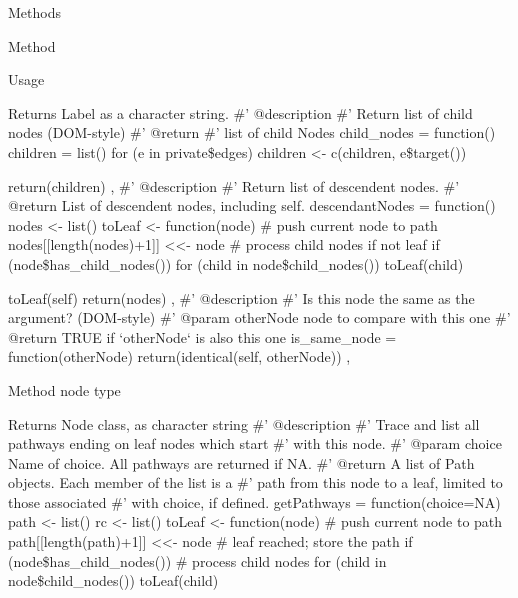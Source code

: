 \documentclass[a4paper]{book}
\begin{document}
\begin{Section}{Methods}
\begin{SubSection}{Method }
\begin{SubSubSection}{Usage}
\end{SubSubSection}


%
\begin{SubSubSection}{Returns}
Label as a character string.
\#' @description
\#' Return list of child nodes (DOM-style)
\#' @return 
\#' list of child Nodes
child\_nodes = function() 
children = list()
for (e in private\$edges) 
children <- c(children, e\$target())

return(children)
,
\#' @description 
\#' Return list of descendent nodes.
\#' @return List of descendent nodes, including self.
descendantNodes = function() 
nodes <- list()
toLeaf <- function(node) 
\# push current node to path
nodes[[length(nodes)+1]] <<- node
\# process child nodes if not leaf
if (node\$has\_child\_nodes()) 
for (child in node\$child\_nodes()) 
toLeaf(child)



toLeaf(self)
return(nodes)
,
\#' @description
\#' Is this node the same as the argument? (DOM-style)
\#' @param otherNode node to compare with this one
\#' @return TRUE if `otherNode` is also this one
is\_same\_node = function(otherNode) 
return(identical(self, otherNode)) 
,
\end{SubSubSection}

\end{SubSection}



\hypertarget{method-type}{}
%
\begin{SubSection}{Method }
node type
%


%
\begin{SubSubSection}{Returns}
Node class, as character string
\#' @description
\#' Trace and list all pathways ending on leaf nodes which start
\#' with this node.
\#' @param choice Name of choice. All pathways are returned if NA.
\#' @return A list of Path objects. Each member of the list is a
\#' path from this node to a leaf, limited to those associated
\#' with choice, if defined.
getPathways = function(choice=NA) 
path <- list()
rc <- list()
toLeaf <- function(node) 
\# push current node to path
path[[length(path)+1]] <<- node
\# leaf reached; store the path
if (node\$has\_child\_nodes()) 
\# process child nodes
for (child in node\$child\_nodes()) 
toLeaf(child)



\end{SubSubSection}
\end{SubSection}
\end{Section}
\end{document}
